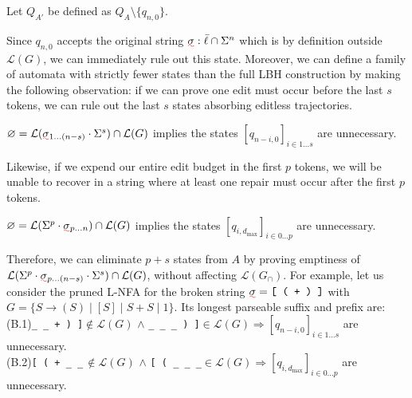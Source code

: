 \documentclass[sigplan,acmsmall,nonacm,screen]{acmart}\settopmatter{printfolios=false,printccs=false,printacmref=false}
\begin{document}
\begin{theorem}
  Let $Q_{A'}$ be defined as $Q_A \setminus \{q_{n, 0}\}$.
\end{theorem}

Since $q_{n, 0}$ accepts the original string $\err\sigma: \bar\ell \cap \Sigma^n$ which is by definition outside $\mathcal{L}(G)$, we can immediately rule out this state. Moreover, we can define a family of automata with strictly fewer states than the full LBH construction by making the following observation: if we can prove one edit must occur before the last $s$ tokens, we can rule out the last $s$ states absorbing editless trajectories.

\begin{theorem}
  $\varnothing = \mathcal{L}(\err\sigma_{1 \ldots (n-s)}\cdot\Sigma^s)\cap \mathcal{L}(G)$ implies the states $[q_{n-i, 0}]_{i \in 1\ldots s}$ are unnecessary.
\end{theorem}

Likewise, if we expend our entire edit budget in the first $p$ tokens, we will be unable to recover in a string where at least one repair must occur after the first $p$ tokens.

\begin{theorem}
  $\varnothing = \mathcal{L}(\Sigma^p\cdot\err\sigma_{p\ldots n})\cap \mathcal{L}(G)$ implies the states $[q_{i, d_{\max}}]_{i \in 0\ldots p}$ are unnecessary.
\end{theorem}

\noindent Therefore, we can eliminate $p+s$ states from $A$ by proving emptiness of $\mathcal{L}(\Sigma^p\cdot\err\sigma_{p\ldots (n-s)}\cdot\Sigma^s) \cap \mathcal{L}(G)$, without affecting $\mathcal{L}(G_\cap)$. For example, let us consider the pruned L-NFA for the broken string $\err\sigma = \texttt{[ ( + ) ]}$ with $G = \{S \rightarrow ( S ) \mid [ S ] \mid S + S \mid 1\}$. Its longest parseable suffix and prefix are:\\

\noindent(B.1)\phantom{..}\texttt{\_ \_ + ) ]}\phantom{.}$\not\in \mathcal{L}(G)$\phantom{...}\phantom{...} $\land$ \phantom{...}\texttt{\_ \_ \_ ) ]}\phantom{...}$\in \mathcal{L}(G)$\phantom{...}\phantom{...}$\Longrightarrow [q_{n-i, 0}]_{i \in 1\ldots s}$ are unnecessary.\\
\noindent(B.2)\phantom{..}\texttt{[ ( + \_ \_}$\hspace{2pt}\not\in \mathcal{L}(G)$\phantom{...}\phantom{...} $\land$ \phantom{...}\texttt{[ ( \_ \_ \_}\phantom{...}$\in \mathcal{L}(G)$\phantom{...}\phantom{...}$\Longrightarrow [q_{i, d_{\max}}]_{i \in 0\ldots p}$ are unnecessary.\\
\end{document}
